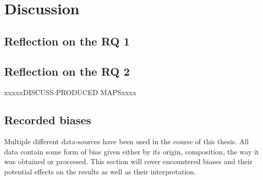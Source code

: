 \chapter{Discussion} \label{discussion}

\section{Reflection on the RQ 1}


\section{Reflection on the RQ 2}
xxxxxDISCUSS PRODUCED MAPSxxxx

\section{Recorded biases} \label{discussion_rec_bias}
Multiple different data-sources have been used in the course of this thesis. All data contain some form of bias given either by its origin, composition, the way it was obtained or processed. 
This section will cover encountered biases and their potential effects on the results as well as their interpretation.

